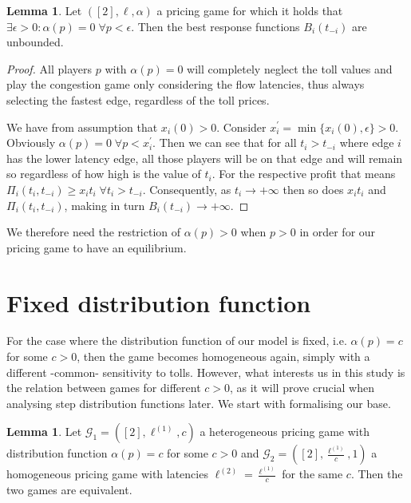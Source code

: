 \documentclass[10pt,a4paper]{book}
\newcommand{\Gm}{\mathcal{G}}
\theoremstyle{definition}
\newtheorem{lemma}[definition]{Lemma}
\theoremstyle{comment}
\begin{document}
\begin{lemma}
	\label{lemma:a_0_0}
	Let $([2], \ell, \alpha)$ a pricing game for which it holds that $\exists \epsilon > 0: \alpha(p) = 0 \; \forall p < \epsilon$.
	Then the best response functions $B_i(t_{-i})$ are unbounded.
\end{lemma}

\begin{proof}
	All players $p$ with $\alpha(p) = 0$ will completely neglect the toll values and play the congestion game only considering the flow latencies, thus always selecting the fastest edge, regardless of the toll prices.

	We have from assumption that $x_i(0) > 0$.
	Consider $x_i^\prime = \min\{x_i(0), \epsilon\} > 0$.
	Obviously $\alpha(p) = 0 \; \forall p < x_i^\prime$.
	Then we can see that for all $t_i > t_{-i}$ where edge $i$ has the lower latency edge, all those players will be on that edge and will remain so regardless of how high is the value of $t_i$.
	For the respective profit that means $\Pi_i(t_i, t_{-i}) \ge x_i t_i \; \forall t_i > t_{-i}$.
	Consequently, as $t_i \rightarrow +\infty$ then so does $x_i t_i$ and $\Pi_i(t_i, t_{-i})$, making in turn $B_i(t_{-i}) \rightarrow +\infty$.
\end{proof}
We therefore need the restriction of $\alpha(p) > 0$ when $p > 0$ in order for our pricing game to have an equilibrium.

\section{Fixed distribution function}

For the case where the distribution function of our model is fixed, i.e. $\alpha(p) = c$ for some $c > 0$, then the game becomes homogeneous again, simply with a different -common- sensitivity to tolls.
However, what interests us in this study is the relation between games for different $c > 0$, as it will prove crucial when analysing step distribution functions later.
We start with formalising our base.

\begin{lemma}
	\label{lemma:a_fixed_homogeneous}
	Let $\Gm_1 = ([2], \ell^{(1)}, c)$ a heterogeneous pricing game with distribution function $\alpha(p) = c$ for some $c > 0$ and $\Gm_2 = ([2], \frac{\ell^{(1)}}{c}, 1)$ a homogeneous pricing game with latencies $\ell^{(2)} = \frac{\ell^{(1)}}{c}$ for the same $c$.
	Then the two games are equivalent.
\end{lemma}
\end{document}
